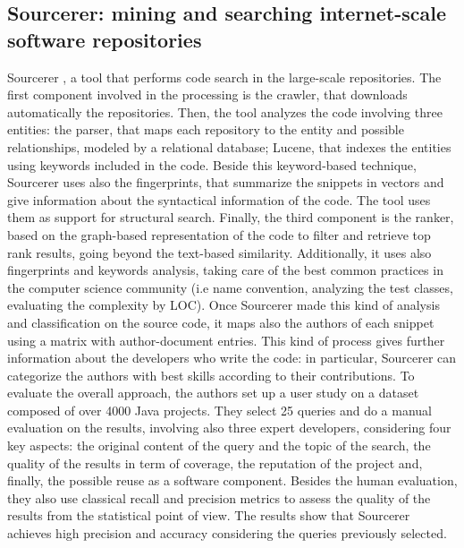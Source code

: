 \subsection{Sourcerer: mining and searching internet-scale software repositories}
Sourcerer \cite{DBLP:journals/datamine/LinsteadBNRLB09}, a tool that performs code search in the large-scale repositories. The first component involved in the processing is the crawler, that downloads automatically the repositories. Then, the tool analyzes the code involving three entities: the parser, that maps each repository to the entity and possible relationships, modeled by a relational database; Lucene, that indexes the entities using keywords included in the code. Beside this keyword-based technique, Sourcerer uses also the fingerprints, that summarize the snippets in vectors and give information about the syntactical information of the code. The tool uses them as support for structural search.  Finally, the third component is the ranker, based on the graph-based representation of the code to filter and retrieve top rank results, going beyond the text-based similarity. Additionally, it uses also fingerprints and keywords analysis, taking care of the best common practices in the computer science community (i.e name convention, analyzing the test classes, evaluating the complexity by LOC). Once Sourcerer made this kind of analysis and classification on the source code,  it maps also the authors of each snippet using a matrix with author-document entries. This kind of process gives further information about the developers who write the code: in particular, Sourcerer can categorize the authors with best skills according to their contributions. To evaluate the overall approach, the authors set up a user study on a dataset composed of over 4000 Java projects. They select 25 queries and do a manual evaluation  on the results, involving also three expert developers, considering four key aspects: the original content of the query and the topic of the search, the quality of the results in term of coverage, the reputation of the project and, finally, the possible reuse as a software component. Besides the human evaluation, they also use classical recall and precision metrics to assess the quality of the results from the statistical point of view. The results show that Sourcerer achieves high precision and accuracy considering the queries previously selected. 

